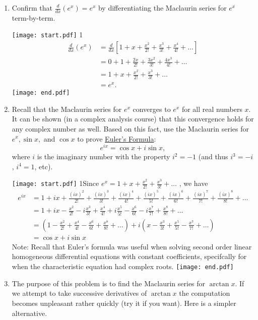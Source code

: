 \documentclass[12pt]{article}
\begin{document}
\begin{enumerate}

\item Confirm that $\frac{d}{dx}(e^x)=e^x$ by differentiating the Maclaurin series for $e^x$ term-by-term.

\texttt{[image: start.pdf]}
{{{1\linewidth}{\begin{align*} \frac{d}{dx}(e^x)&=\frac{d}{dx}\left[1+x+\frac{x^2}{2!}+\frac{x^3}{3!}+\frac{x^4}{4!}+\ldots \right] \\
&=0+1+\frac{2x}{2!}+\frac{3x^2}{3!}+\frac{4x^3}{4!}+\ldots \\
&=1+x+\frac{x^2}{2!}+\frac{x^3}{3!}+\ldots \\
&=e^x. \end{align*}  }}}
\texttt{[image: end.pdf]}


\item Recall that the Maclaurin series for $e^{x}$ converges to $e^{x}$ for all real numbers $x$.  It can be shown (in a complex analysis course) that this convergence holds for any complex number as well.  Based on this fact, use the Maclaurin
series for $e^x, \sin{x},$ and $\cos{x}$ to prove \underline{Euler's Formula}: $$e^{ix}=\cos{x}+i\sin{x},$$ where $i$ is the imaginary number with the property $i^2=-1$ (and thus $i^3=-i$, $i^4=1$, etc).

\texttt{[image: start.pdf]}
{{{1\linewidth}{Since $e^x=1+x+\frac{x^2}{2!}+\frac{x^3}{3!}+\ldots$ \text{ }, we have 
\begin{align*}  e^{ix}&=1+ix+\frac{(ix)^2}{2!}+\frac{(ix)^3}{3!}+\frac{(ix)^4}{4!}+\frac{(ix)^5}{5!}+\frac{(ix)^6}{6!}+\frac{(ix)^7}{7!}+\frac{(ix)^8}{8!}+\ldots
\\ &=1+ix-\frac{x^2}{2!}-i\frac{x^3}{3!}+\frac{x^4}{4!}+i\frac{x^5}{5!}-\frac{x^6}{6!}-i\frac{x^7}{7!}+\frac{x^8}{8!}+\ldots 
\\ &=\left(1-\frac{x^2}{2!}+\frac{x^4}{4!}-\frac{x^6}{6!}+\frac{x^8}{8!}+\ldots\right)+i\left(x-\frac{x^3}{3!}+\frac{x^5}{5!}-\frac{x^7}{7!}+\ldots\right)
\\ &=\cos{x}+i\sin{x} \end{align*} 
Note: Recall that Euler's formula was useful when solving second order linear homogeneous differential equations with constant coefficients, specifcally for when the characteristic equation had complex roots.}}}
\texttt{[image: end.pdf]}



\item The purpose of this problem is to find the Maclaurin series for $\arctan{x}$.  If we attempt to take successive derivatives of $\arctan{x}$ the computation becomes unpleasant rather quickly (try it if you want).  Here is
a simpler alternative. 


\end{enumerate}
\end{document}
